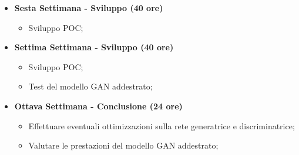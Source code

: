 {\begin{itemize}
\begin{itemize}
              \end{itemize}
        \item \textbf{Sesta Settimana - Sviluppo (40 ore)}
              \begin{itemize}
                  \item Sviluppo POC;
              \end{itemize}
        \item \textbf{Settima Settimana - Sviluppo (40 ore)}
              \begin{itemize}
                  \item Sviluppo POC;
                  \item Test del modello GAN addestrato;
              \end{itemize}
        \item \textbf{Ottava Settimana - Conclusione (24 ore)}
              \begin{itemize}
                  \item Effettuare eventuali ottimizzazioni sulla rete generatrice e discriminatrice;
                  \item Valutare le prestazioni del modello GAN addestrato;
              \end{itemize}
    \end{itemize}
}

\newcommand{\totaleOre}{304}

\newcommand{\obiettiviObbligatori}{
    \item \underline{\textit{O01}}: Comprendere il funzionamento teorico dei GAN e le loro applicazioni per la generazione di immagini.;
    \item \underline{\textit{O02}}: Sviluppare la capacità di autogestirsi e affrontare argomenti sull'argomento GAN attraverso l'autoformazione;
    \item \underline{\textit{O03}}: Sviluppo di un POC dimostrativo;

}

\newcommand{\obiettiviDesiderabili}{
    \item \underline{\textit{D01}}: Implementazione di un modello GAN per la generazione di immagini funzionante;
    \item \underline{\textit{D02}}: Generazione di immagini realistiche e coerenti con il dataset di addestramento
    \item \underline{\textit{D03}}: Personalizzare il modello GAN per l'inserimento del brand "Replay" nelle immagini di output
}

\newcommand{\obiettiviFacoltativi}{
    \item \underline{\textit{F01}}: Ottimizzazione del modello GAN
    \item \underline{\textit{F02}}: Valutare le prestazioni del modello GAN
    \item \item \underline{\textit{F03}}: Test applicazione prodotto finale in ambito aziendale
}